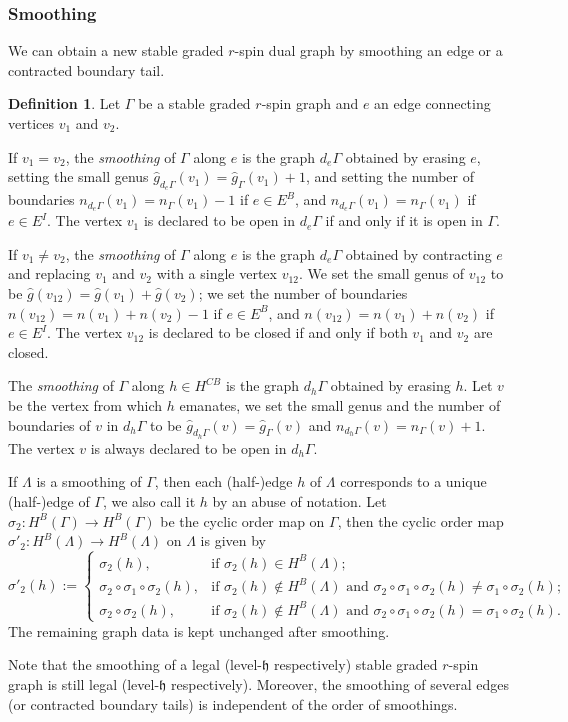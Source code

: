 \documentclass[11pt,a4paper]{article}
\theoremstyle{definition}
\newtheorem{dfn}[dummy]{Definition}
\theoremstyle{remark}
\numberwithin{equation}{section}
\def\h{{\mathfrak h}}
\begin{document}
\subsubsection*{Smoothing}
We can obtain a new stable graded $r$-spin dual graph by smoothing an edge or a contracted boundary tail. 
\begin{dfn}\label{def smoothing graph}
Let $\Gamma$ be a stable graded $r$-spin graph and $e$ an edge connecting vertices $v_1$ and $v_2$.  

If $v_1=v_2$, the \textit{smoothing} of $\Gamma$ along $e$ is the graph $d_e\Gamma$ obtained by erasing $e$, setting the small genus $\hat g_{d_e\Gamma}(v_1)=\hat g_{\Gamma}(v_1)+1$, and setting the number of boundaries $n_{d_e\Gamma}(v_1)=n_{\Gamma}(v_1)-1$ if $e\in E^B$, and   $n_{d_e\Gamma}(v_1)=n_{\Gamma}(v_1)$ if $e\in E^I$. The vertex $v_1$ is declared to be open in $d_e\Gamma$ if and only if it is open in $\Gamma$.

If $v_1\ne v_2$, the \textit{smoothing} of $\Gamma$ along $e$ is the graph $d_e\Gamma$ obtained by contracting $e$ and replacing $v_1$ and $v_2$ with a single vertex $v_{12}$. We set the small genus of $v_{12}$ to be $\hat g(v_{12})=\hat g(v_{1})+\hat g(v_{2})$; we set the number of boundaries  $n(v_{12})=n(v_1)+n(v_2)-1$ if $e\in E^B$, and  $n(v_{12})=n(v_1)+n(v_2)$ if $e\in E^I$.
The vertex $v_{12}$ is declared to be closed if and only if both $v_1$ and $v_2$ are closed. 


The \textit{smoothing} of $\Gamma$ along $h \in H^{CB}$ is the graph $d_h\Gamma$ obtained by erasing $h$. Let $v$ be the vertex from which $h$ emanates, we set the small genus and the number of boundaries of $v$ in $d_h\Gamma$ to be $\hat g_{d_h\Gamma}(v)=\hat g_{\Gamma}(v)$ and $n_{d_h\Gamma}(v)=n_{\Gamma}(v)+1$.
The vertex $v$ is always declared to be open in $d_h\Gamma$. 

If $\Lambda$ is a smoothing of $\Gamma$, then each (half-)edge $h$ of $\Lambda$ corresponds to a unique (half-)edge of $\Gamma$, we also call it $h$ by an abuse of notation. Let $\sigma_2\colon H^B(\Gamma)\to H^B(\Gamma)$ be the cyclic order map on $\Gamma$, then the cyclic order map $\sigma'_2\colon H^B(\Lambda)\to H^B(\Lambda)$ on $\Lambda$ is given by
\[
\sigma'_2(h):=
\begin{cases}
\sigma_2(h),&\text{if $\sigma_2(h)\in H^B(\Lambda)$};\\
\sigma_2\circ\sigma_1\circ\sigma_2(h),&\text{if  $\sigma_2(h)\notin H^B(\Lambda)$ and $\sigma_2\circ\sigma_1\circ\sigma_2(h)\ne \sigma_1\circ\sigma_2(h)$};\\
\sigma_2\circ\sigma_2(h),&\text{if  $\sigma_2(h)\notin H^B(\Lambda)$ and  $\sigma_2\circ\sigma_1\circ\sigma_2(h)= \sigma_1\circ\sigma_2(h)$}.
\end{cases}
\]
The remaining graph data is kept unchanged after smoothing.


\end{dfn}
Note that the smoothing of a legal (level-$\h$ respectively) stable  graded $r$-spin graph is still legal (level-$\h$ respectively). Moreover, the smoothing of several edges (or contracted boundary tails) is independent of the order of smoothings.
\end{document}
